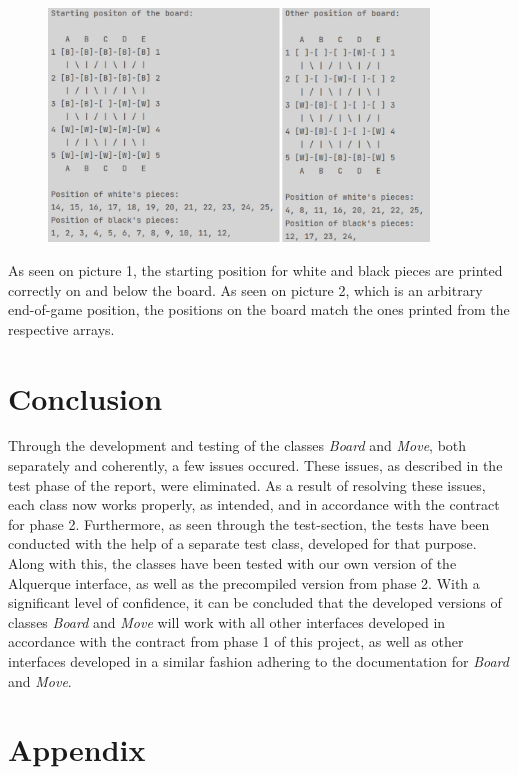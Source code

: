 \documentclass[12pt, a4paper]{article}
\begin{document}
\begin{figure}[h]
	\centering
	\includegraphics[width=0.9\textwidth]{2in1.png}	
\end{figure}

As seen on picture 1, the starting position for white and black pieces are printed correctly on and below the board.
As seen on picture 2, which is an arbitrary end-of-game position, the positions on the board match the ones printed from the respective arrays.

\newpage

\section{Conclusion}
Through the development and testing of the classes \emph{Board} and \emph{Move}, both separately and coherently, a few issues occured. These issues, as described in the test phase of the report, were eliminated. As a result of resolving these issues, each class now works properly, as intended, and in accordance with the contract for phase 2. Furthermore, as seen through the test-section, the tests have been conducted with the help of a separate test class, developed for that purpose. Along with this, the classes have been tested with our own version of the Alquerque interface, as well as the precompiled version from phase 2. With a significant level of confidence, it can be concluded that the developed versions of classes \emph{Board} and \emph{Move} will work with all other interfaces developed in accordance with the contract from phase 1 of this project, as well as other interfaces developed in a similar fashion adhering to the documentation for \emph{Board} and \emph{Move}.


\newpage

\section{Appendix}
\end{document}
